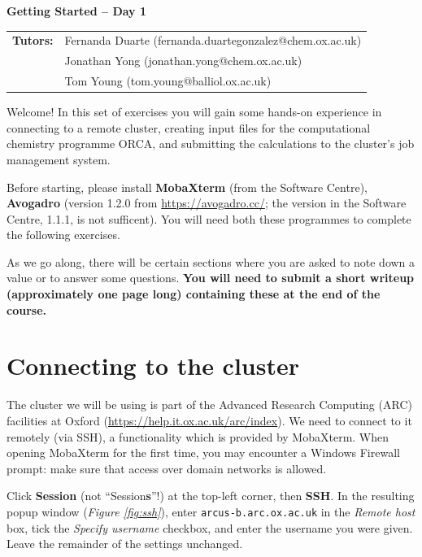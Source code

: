 \documentclass[10pt]{article}
\newcommand{\figref}[1]{\textit{Figure \ref{fig:#1}}}
\begin{document}
\textbf{\LARGE Getting Started -- Day 1}

\vspace{0.5cm}

\begin{tabular}{ll} %
    \textbf{Tutors:} & Fernanda Duarte (fernanda.duartegonzalez@chem.ox.ac.uk) \\
     & Jonathan Yong (jonathan.yong@chem.ox.ac.uk) \\
     & Tom Young (tom.young@balliol.ox.ac.uk)
\end{tabular}

\vspace{0.5cm}

Welcome! In this set of exercises you will gain some hands-on experience in connecting to a remote cluster, creating input files for the computational chemistry programme ORCA, and submitting the calculations to the cluster's job management system. 

Before starting, please install \textbf{MobaXterm} (from the Software Centre), \textbf{Avogadro} (version 1.2.0 from \url{https://avogadro.cc/}; the version in the Software Centre, 1.1.1, is not sufficent). You will need both these programmes to complete the following exercises.

As we go along, there will be certain sections where you are asked to note down a value or to answer some questions. \textbf{You will need to submit a short writeup (approximately one page long) containing these at the end of the course.}

\section{Connecting to the cluster}

The cluster we will be using is part of the Advanced Research Computing (ARC) facilities at Oxford (\url{https://help.it.ox.ac.uk/arc/index}). We need to connect to it remotely (via SSH), a functionality which is provided by MobaXterm. When opening MobaXterm for the first time, you may encounter a Windows Firewall prompt: make sure that access over domain networks is allowed.

Click \textbf{Session} (not ``Session\textbf{s}''!) at the top-left corner, then \textbf{SSH}.  In the resulting popup window (\figref{ssh}), enter \texttt{arcus-b.arc.ox.ac.uk} in the \textit{Remote host} box, tick the \textit{Specify username} checkbox, and enter the username you were given. Leave the remainder of the settings unchanged.
\end{document}
